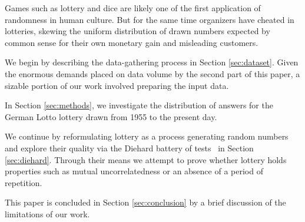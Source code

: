 Games such as lottery and dice are likely one of the first application of randomness in human culture.
But for the same time organizers have cheated in lotteries, skewing the uniform distribution of drawn numbers expected by common sense for their
own monetary gain and misleading customers.

We begin by describing the data-gathering process in Section \ref{sec:dataset}. Given the enormous demands placed on data volume by the second
part of this paper, a sizable portion of our work involved preparing the input data.

In Section \ref{sec:methods}, we investigate the distribution of answers for the German Lotto lottery drawn from 1955 to the present day.

We continue by reformulating lottery as a process generating random numbers and explore their quality via the Diehard battery of tests~\cite{diehard}
in Section \ref{sec:diehard}. Through their means we attempt to prove whether lottery holds properties such as mutual uncorrelatedness or an absence
of a period of repetition.

This paper is concluded in Section \ref{sec:conclusion} by a brief discussion of the limitations of our work.
